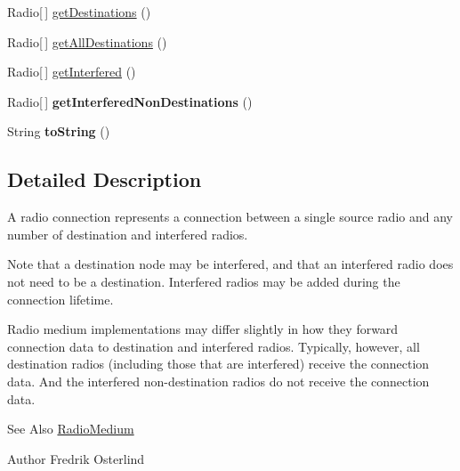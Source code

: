 \begin{DoxyCompactItemize}
\item 
Radio\mbox{[}$\,$\mbox{]} \hyperlink{classorg_1_1contikios_1_1cooja_1_1RadioConnection_ad58d2f1f7529dfc6fb5fb573c666875a}{get\-Destinations} ()
\item 
Radio\mbox{[}$\,$\mbox{]} \hyperlink{classorg_1_1contikios_1_1cooja_1_1RadioConnection_abe5029d3e9dfed7d4d83994bf706c2c9}{get\-All\-Destinations} ()
\item 
Radio\mbox{[}$\,$\mbox{]} \hyperlink{classorg_1_1contikios_1_1cooja_1_1RadioConnection_a51a86f77fa9cea56aa1333c71bd7b20a}{get\-Interfered} ()
\item 
\hypertarget{classorg_1_1contikios_1_1cooja_1_1RadioConnection_a73d8be903af6e728425b3ae5aa1ce308}{Radio\mbox{[}$\,$\mbox{]} {\bfseries get\-Interfered\-Non\-Destinations} ()}\label{classorg_1_1contikios_1_1cooja_1_1RadioConnection_a73d8be903af6e728425b3ae5aa1ce308}

\item 
\hypertarget{classorg_1_1contikios_1_1cooja_1_1RadioConnection_adda2c2eb516d11a34c4597e4eea1f17a}{String {\bfseries to\-String} ()}\label{classorg_1_1contikios_1_1cooja_1_1RadioConnection_adda2c2eb516d11a34c4597e4eea1f17a}

\end{DoxyCompactItemize}


\subsection{Detailed Description}
A radio connection represents a connection between a single source radio and any number of destination and interfered radios.

Note that a destination node may be interfered, and that an interfered radio does not need to be a destination. Interfered radios may be added during the connection lifetime.

Radio medium implementations may differ slightly in how they forward connection data to destination and interfered radios. Typically, however, all destination radios (including those that are interfered) receive the connection data. And the interfered non-\/destination radios do not receive the connection data.

\begin{DoxySeeAlso}{See Also}
\hyperlink{classorg_1_1contikios_1_1cooja_1_1RadioMedium}{Radio\-Medium} 
\end{DoxySeeAlso}
\begin{DoxyAuthor}{Author}
Fredrik Osterlind 
\end{DoxyAuthor}


